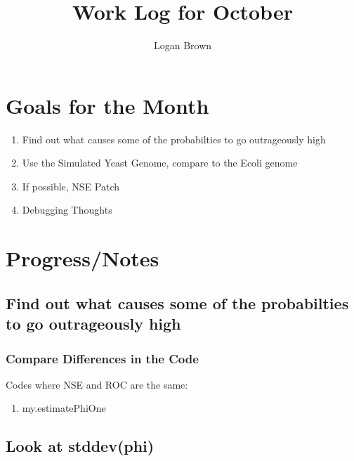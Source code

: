 

\title{Work Log for October}
\author{Logan Brown}



\maketitle
\tableofcontents

\newpage


\section{Goals for the Month}
\begin{enumerate}
\item Find out what causes some of the probabilties to go outrageously high
\item Use the Simulated Yeast Genome, compare to the Ecoli genome
\item If possible, NSE Patch
\item Debugging Thoughts
\end{enumerate}

\section{Progress/Notes}

\subsection{Find out what causes some of the probabilties to go outrageously high}

\subsubsection{Compare Differences in the Code}

Codes where NSE and ROC are the same:
\begin{enumerate}
\item my.estimatePhiOne

\end{enumerate}


\subsection{Look at stddev(phi)}

